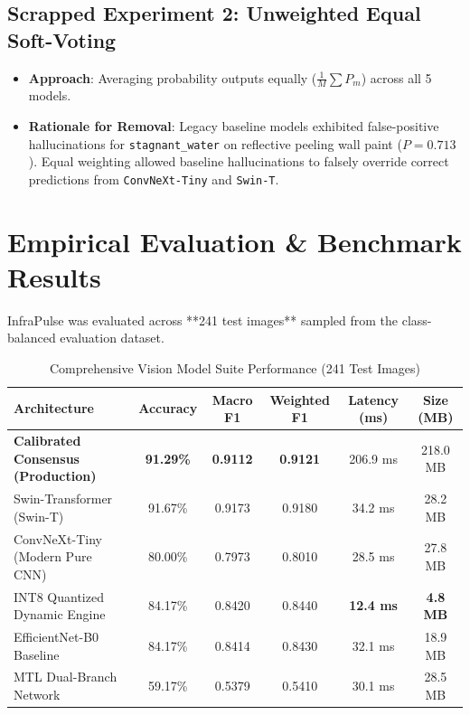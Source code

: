 \documentclass[11pt,a4paper]{article}
\begin{document}
\subsection{Scrapped Experiment 2: Unweighted Equal Soft-Voting}
\begin{itemize}
    \item \textbf{Approach}: Averaging probability outputs equally ($\frac{1}{M} \sum P_m$) across all 5 models.
    \item \textbf{Rationale for Removal}: Legacy baseline models exhibited false-positive hallucinations for \texttt{stagnant\_water} on reflective peeling wall paint ($P=0.713$). Equal weighting allowed baseline hallucinations to falsely override correct predictions from \texttt{ConvNeXt-Tiny} and \texttt{Swin-T}.
\end{itemize}

\section{Empirical Evaluation \& Benchmark Results}

InfraPulse was evaluated across **241 test images** sampled from the class-balanced evaluation dataset.

\begin{table}[H]
\centering
\caption{Comprehensive Vision Model Suite Performance (241 Test Images)}
\label{tab:benchmarks}
\begin{tabular}{lccccc}
\toprule
\textbf{Architecture} & \textbf{Accuracy} & \textbf{Macro F1} & \textbf{Weighted F1} & \textbf{Latency (ms)} & \textbf{Size (MB)} \\
\midrule
\textbf{Calibrated Consensus (Production)} & \textbf{91.29\%} & \textbf{0.9112} & \textbf{0.9121} & 206.9 ms & 218.0 MB \\
Swin-Transformer (Swin-T) & 91.67\% & 0.9173 & 0.9180 & 34.2 ms & 28.2 MB \\
ConvNeXt-Tiny (Modern Pure CNN) & 80.00\% & 0.7973 & 0.8010 & 28.5 ms & 27.8 MB \\
INT8 Quantized Dynamic Engine & 84.17\% & 0.8420 & 0.8440 & \textbf{12.4 ms} & \textbf{4.8 MB} \\
EfficientNet-B0 Baseline & 84.17\% & 0.8414 & 0.8430 & 32.1 ms & 18.9 MB \\
MTL Dual-Branch Network & 59.17\% & 0.5379 & 0.5410 & 30.1 ms & 28.5 MB \\
\bottomrule
\end{tabular}
\end{table}
\end{document}
